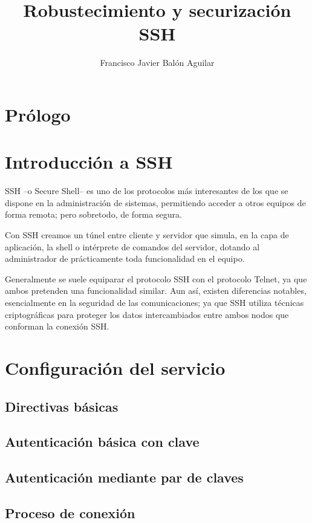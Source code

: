 \documentclass[a4paper, 11pt, titlepage]{article}
\title{Robustecimiento y securización SSH}
\author{Francisco Javier Balón Aguilar}
\begin{document}
\maketitle
\renewcommand{\contentsname}{Índice}
\tableofcontents
\newpage

\section*{Prólogo}
\newpage

\section{Introducción a SSH}

    SSH --o Secure Shell-- es uno de los protocolos más interesantes de los que se dispone 
    en la administración de sistemas, permitiendo acceder a otros equipos de forma remota; 
    pero sobretodo, de forma segura.
    
    Con SSH creamos un túnel entre cliente y servidor que simula, en la capa de aplicación, 
    la shell o intérprete de comandos del servidor, dotando al administrador de prácticamente 
    toda funcionalidad en el equipo.

    Generalmente se suele equiparar el protocolo SSH con el protocolo Telnet, ya que ambos 
    pretenden una funcionalidad similar. Aun así, existen diferencias notables, esencialmente 
    en la seguridad de las comunicaciones; ya que SSH utiliza técnicas criptográficas para 
    proteger los datos intercambiados entre ambos nodos que conforman la conexión SSH.

\section{Configuración del servicio}
    \subsection{Directivas básicas}
    \subsection{Autenticación básica con clave}
    \subsection{Autenticación mediante par de claves}
    \subsection{Proceso de conexión}
\end{document}
